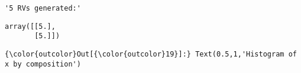 \documentclass[11pt]{article}
\begin{document}
    
    \begin{verbatim}
'5 RVs generated:'
    \end{verbatim}

    
    
    \begin{verbatim}
array([[5.],
       [5.]])
    \end{verbatim}

    
\begin{Verbatim}[commandchars=\\\{\}]
{\color{outcolor}Out[{\color{outcolor}19}]:} Text(0.5,1,'Histogram of x by composition')
\end{Verbatim}
            
    \begin{center}
    \end{center}
    { \hspace*{\fill} \\}
    

    
    
    
    
\end{document}
